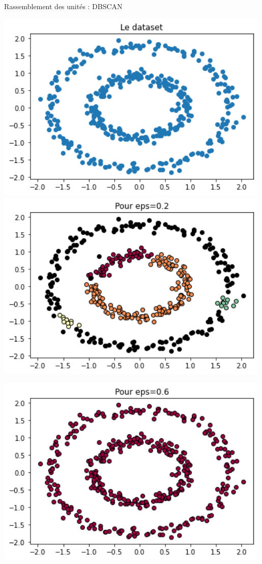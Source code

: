 \documentclass[french]{beamer}
\begin{document}
\begin{frame}{Rassemblement des unités : DBSCAN}
	\begin{minipage}{0.5\textwidth}
		\centering
		\includegraphics[width=0.99\textwidth]{circles.png}
		\includegraphics[width=0.99\textwidth]{petit_eps.png}
	\end{minipage}\hfill
	\begin{minipage}{0.5\textwidth}
		\centering
		\includegraphics[width=0.99\textwidth]{grand_eps.png}

\end{minipage}
\end{frame}
\end{document}
